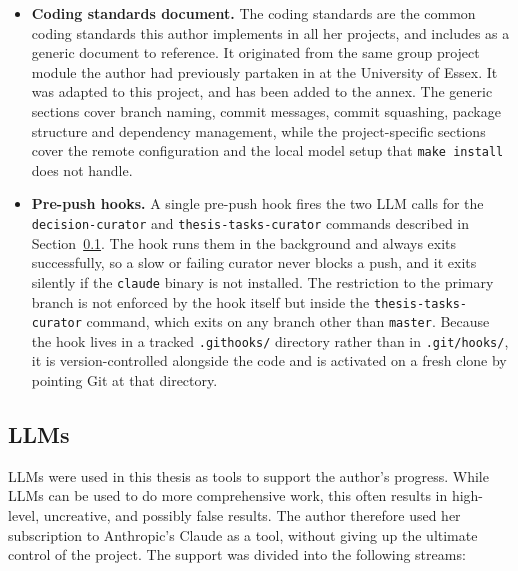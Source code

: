 \begin{itemize}
    \item \textbf{Coding standards document.} The coding standards are the
    common coding standards this author implements in all her projects, and
    includes as a generic document to reference. It originated from the same
    group project module the author had previously partaken in at the University
    of Essex. It was adapted to this project, and has been added to the annex.
    The generic sections cover branch naming, commit messages, commit squashing,
    package structure and dependency management, while the project-specific
    sections cover the remote configuration and the local model setup that
    \texttt{make install} does not handle.

    \item \textbf{Pre-push hooks.} A single pre-push hook fires the two LLM
    calls for the \texttt{decision-curator} and \texttt{thesis-tasks-curator}
    commands described in Section~\ref{sec:llms}. The hook runs them in the
    background and always exits successfully, so a slow or failing curator never
    blocks a push, and it exits silently if the \texttt{claude} binary is not
    installed. The restriction to the primary branch is not enforced by the hook
    itself but inside the \texttt{thesis-tasks-curator} command, which exits on
    any branch other than \texttt{master}. Because the hook lives in a tracked
    \texttt{.githooks/} directory rather than in \texttt{.git/hooks/}, it is
    version-controlled alongside the code and is activated on a fresh clone by
    pointing Git at that directory.
\end{itemize}

\subsection{LLMs}\label{sec:llms}

LLMs were used in this thesis as tools to support the author's progress. While
LLMs can be used to do more comprehensive work, this often results in
high-level, uncreative, and possibly false results. The author therefore used
her subscription to Anthropic's Claude as a tool, without giving up the ultimate
control of the project. The support was divided into the following streams:

